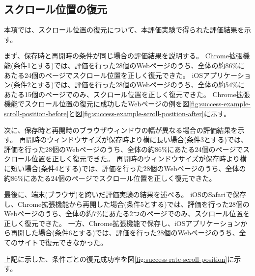 \subsection{スクロール位置の復元}
本項では、スクロール位置の復元について、本評価実験で得られた評価結果を示す。

まず、保存時と再開時の条件が同じ場合の評価結果を説明する。
Chrome拡張機能(条件1とする)では、評価を行った28個のWebページのうち、全体の約86\%にあたる24個のページでスクロール位置を正しく復元できた。
iOSアプリケーション(条件2とする)では、評価を行った28個のWebページのうち、全体の約54\%にあたる15個のページでのみ、スクロール位置を正しく復元できた。
Chrome拡張機能でスクロール位置の復元に成功したWebページの例を図\ref{fig:success-example-scroll-position-before}と図\ref{fig:success-example-scroll-position-after}に示す。

次に、保存時と再開時のブラウザウィンドウの幅が異なる場合の評価結果を示す。
再開時のウィンドウサイズが保存時より横に長い場合(条件3とする)では、評価を行った28個のWebページのうち、全体の約86\%にあたる24個のページでスクロール位置を正しく復元できた。
再開時のウィンドウサイズが保存時より横に短い場合(条件4とする)では、評価を行った28個のWebページのうち、全体の約86\%にあたる24個のページでスクロール位置を正しく復元できた。

最後に、端末(ブラウザ)を跨いだ評価実験の結果を述べる。
iOSのSafariで保存し、Chrome拡張機能から再開した場合(条件5とする)では、評価を行った28個のWebページのうち、全体の約7\%にあたる2つのページでのみ、スクロール位置を正しく復元できた。
一方、Chrome拡張機能で保存し、iOSアプリケーションから再開した場合(条件6とする)では、評価を行った28個のWebページのうち、全てのサイトで復元できなかった。

上記に示した、条件ごとの復元成功率を図\ref{fig:success-rate-scroll-position}に示す。

